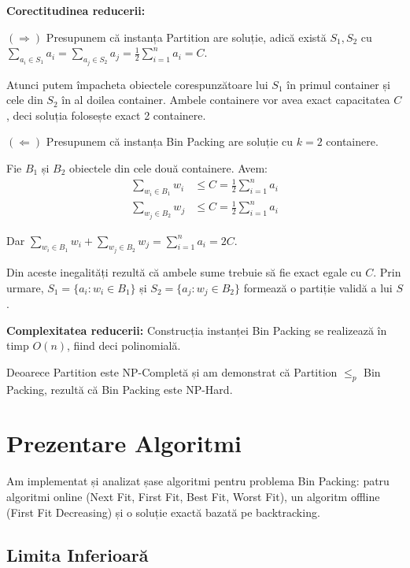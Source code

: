 \documentclass[runningheads]{llncs}
\begin{document}
\textbf{Corectitudinea reducerii:}

$(\Rightarrow)$ Presupunem că instanța Partition are soluție, adică există $S_1, S_2$ cu $\sum_{a_i \in S_1} a_i = \sum_{a_j \in S_2} a_j = \frac{1}{2}\sum_{i=1}^{n} a_i = C$.

Atunci putem împacheta obiectele corespunzătoare lui $S_1$ în primul container și cele din $S_2$ în al doilea container. Ambele containere vor avea exact capacitatea $C$, deci soluția folosește exact 2 containere.

$(\Leftarrow)$ Presupunem că instanța Bin Packing are soluție cu $k = 2$ containere.

Fie $B_1$ și $B_2$ obiectele din cele două containere. Avem:
\begin{align*}
\sum_{w_i \in B_1} w_i &\leq C = \frac{1}{2}\sum_{i=1}^{n} a_i \\
\sum_{w_j \in B_2} w_j &\leq C = \frac{1}{2}\sum_{i=1}^{n} a_i
\end{align*}

Dar $\sum_{w_i \in B_1} w_i + \sum_{w_j \in B_2} w_j = \sum_{i=1}^{n} a_i = 2C$.

Din aceste inegalități rezultă că ambele sume trebuie să fie exact egale cu $C$. Prin urmare, $S_1 = \{a_i : w_i \in B_1\}$ și $S_2 = \{a_j : w_j \in B_2\}$ formează o partiție validă a lui $S$.

\textbf{Complexitatea reducerii:} Construcția instanței Bin Packing se realizează în timp $O(n)$, fiind deci polinomială.

Deoarece Partition este NP-Completă \cite{garey1979computers} și am demonstrat că Partition $\leq_p$ Bin Packing, rezultă că Bin Packing este NP-Hard.

\section{Prezentare Algoritmi}

Am implementat și analizat șase algoritmi pentru problema Bin Packing: patru algoritmi online (Next Fit, First Fit, Best Fit, Worst Fit), un algoritm offline (First Fit Decreasing) și o soluție exactă bazată pe backtracking.

\subsection{Limita Inferioară}
\end{document}
